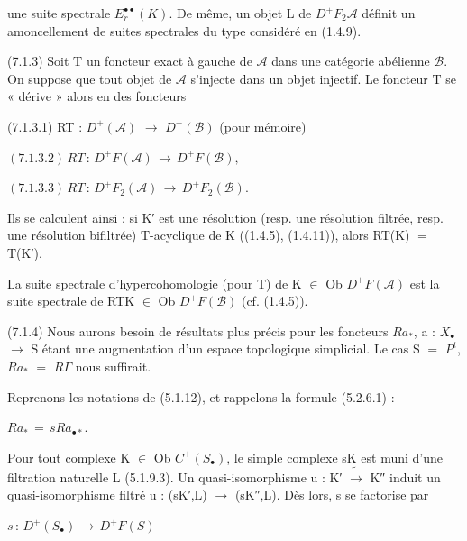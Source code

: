 \documentclass[11pt,twoside]{article}
\newcommand{\DFormula}[1]{%
  \par\smallskip\noindent\hspace*{0pt}\(\displaystyle #1\)\par\smallskip
}
\begin{document}
une suite spectrale \(E_{r}^{\bullet \bullet }(K)\). De même, un objet L de \(D^{+}F_{2}𝒜\) définit un amoncellement de suites spectrales du type considéré en (1.4.9).\par
\par\medskip
(7.1.3) Soit T un foncteur exact à gauche de \(𝒜\) dans une catégorie abélienne \(\mathcal{B}\). On suppose que tout objet de \(𝒜\) s’injecte dans un objet injectif. Le foncteur T se « dérive » alors en des foncteurs\par
\par\medskip
(7.1.3.1) RT : \(D^{+}(𝒜)\) \(\to \) \(D^{+}(\mathcal{B})\)  (pour mémoire)\par
\par\medskip
\DFormula{(7.1.3.2)\,RT\,:\,D^{+}F(𝒜)\,\to \,D^{+}F(\mathcal{B}),}
\par\medskip
\DFormula{(7.1.3.3)\,RT\,:\,D^{+}F_{2}(𝒜)\,\to \,D^{+}F_{2}(\mathcal{B}).}
\par\medskip
Ils se calculent ainsi : si K′ est une résolution (resp. une résolution filtrée, resp. une résolution bifiltrée) T-acyclique de K ((1.4.5), (1.4.11)), alors RT(K) \(=\) T(K′).\par
\par\medskip
La suite spectrale d’hypercohomologie (pour T) de K \(\in \) Ob \(D^{+}F(𝒜)\) est la suite spectrale de RTK \(\in \) Ob \(D^{+}F(\mathcal{B})\) (cf. (1.4.5)).\par
\par\medskip
(7.1.4) Nous aurons besoin de résultats plus précis pour les foncteurs \(Ra_{\ast }\), a : \(X_{\bullet }\) \(\to \) S étant une augmentation d’un espace topologique simplicial. Le cas S \(=\) \(P^{t}\), \(Ra_{\ast }\) \(=\) \(R\Gamma \) nous suffirait.\par
\par\medskip
Reprenons les notations de (5.1.12), et rappelons la formule (5.2.6.1) :\par
\par\medskip
\DFormula{Ra_{\ast }\,=\,sRa_{\bullet \ast }.}
\par\medskip
Pour tout complexe K \(\in \) Ob \(C^{+}(S_{\bullet })\), le simple complexe sK est muni d’une filtration naturelle L (5.1.9.3). Un quasi-isomorphisme u : K′ \(\widetilde{\to }\) K″ induit un quasi-isomorphisme filtré u : (sK′,L) \(\to \) (sK″,L). Dès lors, s se factorise par\par
\par\medskip
\DFormula{s\,:\,D^{+}(S_{\bullet })\,\to \,D^{+}F(S)}
\par\medskip
\end{document}
